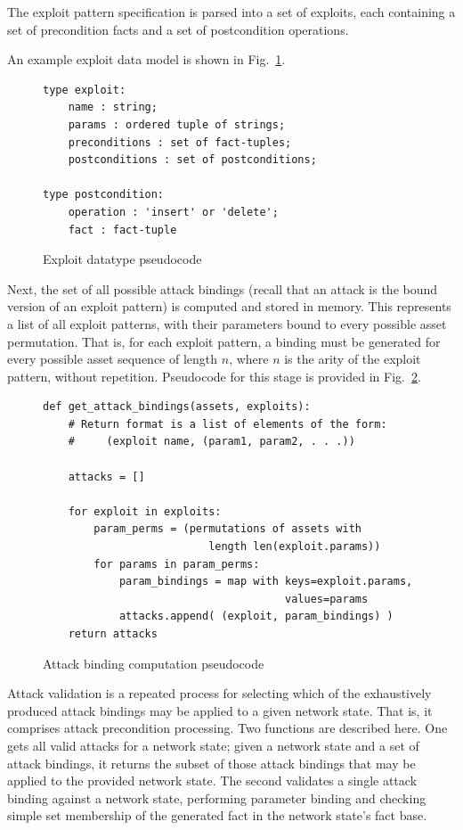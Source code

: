The exploit pattern specification is parsed into a set of exploits, each
containing a set of precondition facts and a set of postcondition operations.

An example exploit data model is shown in
Fig.~\ref{fig:exploit_pc}.

\begin{figure}
\begin{lstlisting}
type exploit:
    name : string;
    params : ordered tuple of strings;
    preconditions : set of fact-tuples;
    postconditions : set of postconditions;
    
type postcondition:
    operation : 'insert' or 'delete';
    fact : fact-tuple
\end{lstlisting}
\label{fig:exploit_pc}
\caption{Exploit datatype pseudocode}
\end{figure}

Next, the set of all possible attack bindings (recall that an attack is the
bound version of an exploit pattern) is computed and stored in memory. This
represents a list of all exploit patterns, with their parameters bound to
every possible asset permutation. That is, for each exploit pattern, a
binding must be generated for every possible asset sequence of length $n$,
where $n$ is the arity of the exploit pattern, without repetition. Pseudocode
for this stage is provided in Fig.~\ref{fig:binding_computation_pc}.

\begin{figure}
\begin{lstlisting}
def get_attack_bindings(assets, exploits):
    # Return format is a list of elements of the form:
    #     (exploit name, (param1, param2, . . .))
    
    attacks = []
    
    for exploit in exploits:
        param_perms = (permutations of assets with 
                          length len(exploit.params))
        for params in param_perms:
            param_bindings = map with keys=exploit.params,
                                      values=params
            attacks.append( (exploit, param_bindings) )
    return attacks
\end{lstlisting}
\label{fig:binding_computation_pc}
\caption{Attack binding computation pseudocode}
\end{figure}

Attack validation is a repeated process for selecting which of the exhaustively
produced attack bindings may be applied to a given network state. That is,
it comprises attack precondition processing. Two functions are described here.
One gets all valid attacks for a network state; given a network state
and a set of attack bindings, it returns the subset of those attack bindings
that may be applied to the provided network state. The second validates a
single attack binding against a network state, performing parameter binding and
checking simple set membership of the generated fact in the network state's
fact base.

